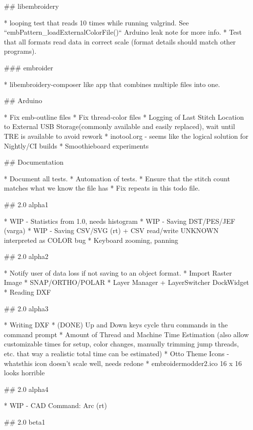 ## libembroidery

* looping test that reads 10 times while running valgrind. See ``embPattern\_loadExternalColorFile()`` Arduino leak note for more info.
* Test that all formats read data in correct scale (format details should match other programs).

### embroider

* libembroidery-composer like app that combines multiple files into one.

## Arduino

* Fix emb-outline files
* Fix thread-color files
* Logging of Last Stitch Location to External USB Storage(commonly available and easily replaced), wait until TRE is available to avoid rework
* inotool.org - seems like the logical solution for Nightly/CI builds
* Smoothieboard experiments

## Documentation

* Document all tests.
* Automation of tests.
* Ensure that the stitch count matches what we know the file has
* Fix repeats in this todo file.

## 2.0 alpha1

* WIP - Statistics from 1.0, needs histogram
* WIP - Saving DST/PES/JEF (varga)
* WIP - Saving CSV/SVG (rt) + CSV read/write UNKNOWN interpreted as COLOR bug
* Keyboard zooming, panning

## 2.0 alpha2

* Notify user of data loss if not saving to an object format.
* Import Raster Image
* SNAP/ORTHO/POLAR
* Layer Manager + LayerSwitcher DockWidget
* Reading DXF

## 2.0 alpha3

* Writing DXF
* (DONE) Up and Down keys cycle thru commands in the command prompt
* Amount of Thread and Machine Time Estimation (also allow customizable times for setup, color changes, manually trimming jump threads, etc. that way a realistic total time can be estimated)
* Otto Theme Icons - whatsthis icon doesn't scale well, needs redone
* embroidermodder2.ico 16 x 16 looks horrible

## 2.0 alpha4

* WIP - CAD Command: Arc (rt)

## 2.0 beta1

